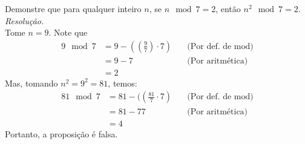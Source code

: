 Demonstre que para qualquer inteiro $n$, se $n \mod 7 = 2$, então $n^2 \mod 7 = 2$. \\
\emph{Resolução.} \\
Tome $n = 9$. Note que
\begin{align*}
	9\mod 7 & = 9 - ((\frac{9}{7}) \cdot 7) & \quad \text{(Por def. de mod)} \\
	        & = 9 - 7                       & \quad \text{(Por aritmética})  \\
	        & = 2
\end{align*}
Mas, tomando $n^2 = 9^2 = 81$, temos:
\begin{align*}
	81\mod 7 & = 81 - ((\frac{81}{7} \cdot 7) & \quad \text{(Por def. de mod)} \\
	         & = 81 - 77                      & \quad \text{(Por aritmética})  \\
	         & = 4
\end{align*}
Portanto, a proposição é falsa.

